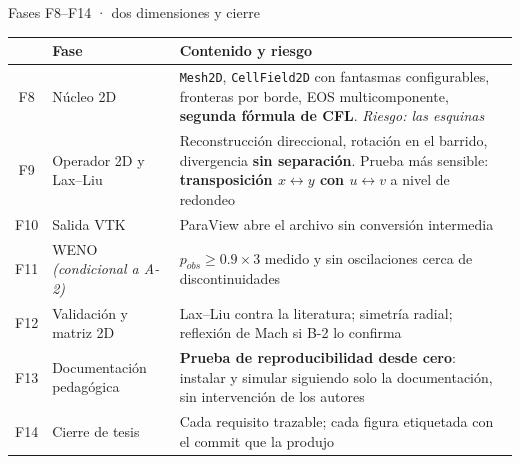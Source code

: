\documentclass[aspectratio=169,10pt]{beamer}
\newcommand{\cod}[1]{\texttt{\small #1}}
\begin{document}
\begin{frame}[shrink]{Fases F8--F14 · dos dimensiones y cierre}
  \centering\scriptsize
  \begin{tabular}{@{}clp{58mm}@{}}
    \toprule
    & \textbf{Fase} & \textbf{Contenido y riesgo} \\
    \midrule
    F8 & Núcleo 2D & \cod{Mesh2D}, \cod{CellField2D} con fantasmas configurables, fronteras por borde, EOS multicomponente, \textbf{segunda fórmula de CFL}. \emph{Riesgo: las esquinas} \\
    \midrule
    F9 & Operador 2D y Lax--Liu & Reconstrucción direccional, rotación en el barrido, divergencia \textbf{sin separación}. Prueba más sensible: \textbf{transposición $x\leftrightarrow y$ con $u\leftrightarrow v$} a nivel de redondeo \\
    \midrule
    F10 & Salida VTK & ParaView abre el archivo sin conversión intermedia \\
    \midrule
    F11 & WENO \emph{(condicional a A-2)} & $p_{obs}\ge 0.9\times 3$ medido y sin oscilaciones cerca de discontinuidades \\
    \midrule
    F12 & Validación y matriz 2D & Lax--Liu contra la literatura; simetría radial; reflexión de Mach si B-2 lo confirma \\
    \midrule
    F13 & Documentación pedagógica & \textbf{Prueba de reproducibilidad desde cero}: instalar y simular siguiendo solo la documentación, sin intervención de los autores \\
    \midrule
    F14 & Cierre de tesis & Cada requisito trazable; cada figura etiquetada con el commit que la produjo \\
    \bottomrule
  \end{tabular}
\end{frame}
\end{document}
